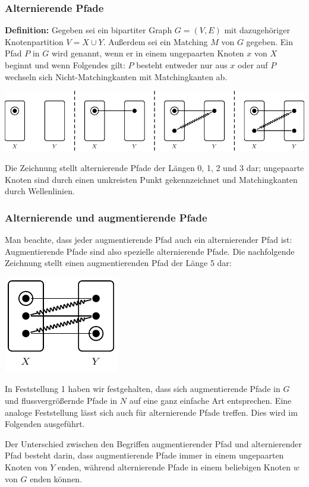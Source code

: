 \documentclass[smaller]{beamer}
\begin{document}
\begin{frame}
 \frametitle{Alternierende Pfade}
 \textbf{Definition:}
Gegeben sei ein bipartiter Graph $G=(V,E)$ mit dazugehöriger Knotenpartition $V=X \cup Y$. Außerdem sei ein Matching $M$ von $G$ gegeben. Ein Pfad $P$ in $G$ wird  genannt, wenn er in einem ungepaarten Knoten $x$ von $X$ beginnt und wenn Folgendes gilt: $P$ besteht entweder nur aus $x$ oder auf $P$ wechseln sich Nicht-Matchingkanten mit Matchingkanten ab.

\begin{center}
 \includegraphics[scale=0.8]{fig43.pdf}
\end{center}
Die Zeichnung stellt alternierende Pfade der Längen 0, 1, 2 und 3 dar; ungepaarte Knoten sind durch einen umkreisten Punkt gekennzeichnet und Matchingkanten durch Wellenlinien.
\end{frame}

\begin{frame}
 \frametitle{Alternierende und augmentierende Pfade}
 Man beachte, dass jeder augmentierende Pfad auch ein alternierender Pfad ist: \alert{Augmentierende Pfade sind also spezielle alternierende Pfade}. Die nachfolgende Zeichnung stellt einen augmentierenden Pfad der Länge 5 dar:

\begin{center}
\includegraphics[scale=0.9]{fig44.pdf}
\end{center}

In Feststellung 1 haben wir festgehalten, dass sich augmentierende Pfade in $G$ und flussvergrößernde Pfade in $N$ auf eine ganz einfache Art entsprechen. \alert{Eine analoge Feststellung lässt sich auch für alternierende Pfade treffen}. Dies wird im Folgenden ausgeführt. \\ \vspace*{0.2cm}

Der Unterschied zwischen den Begriffen {\glqq}augmentierender Pfad{\grqq} und {\glqq}alternierender Pfad{\grqq} besteht darin, dass augmentierende Pfade immer in einem ungepaarten Knoten von $Y$ enden, während alternierende Pfade in einem beliebigen Knoten $w$ von $G$ enden können.
\end{frame}
\end{document}
